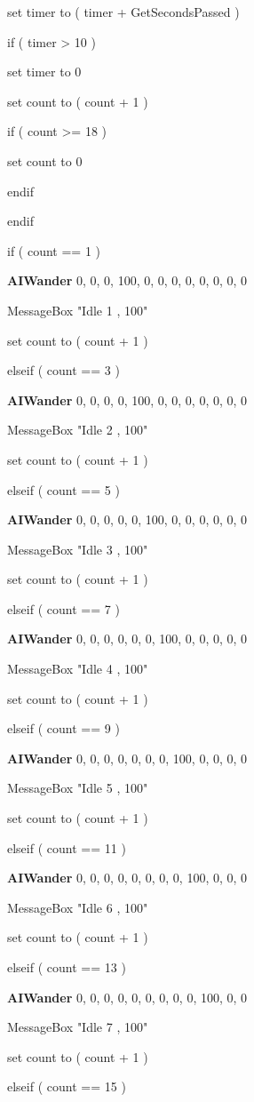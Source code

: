 \documentclass[
]{article}
\begin{document}
set timer to ( timer + GetSecondsPassed )

if ( timer \textgreater{} 10 )

set timer to 0

set count to ( count + 1 )

if ( count \textgreater= 18 )

set count to 0

endif

endif

if ( count == 1 )

\textbf{AIWander} 0, 0, 0, 100, 0, 0, 0, 0, 0, 0, 0, 0

MessageBox "Idle 1 , 100"

set count to ( count + 1 )

elseif ( count == 3 )

\textbf{AIWander} 0, 0, 0, 0, 100, 0, 0, 0, 0, 0, 0, 0

MessageBox "Idle 2 , 100"

set count to ( count + 1 )

elseif ( count == 5 )

\textbf{AIWander} 0, 0, 0, 0, 0, 100, 0, 0, 0, 0, 0, 0

MessageBox "Idle 3 , 100"

set count to ( count + 1 )

elseif ( count == 7 )

\textbf{AIWander} 0, 0, 0, 0, 0, 0, 100, 0, 0, 0, 0, 0

MessageBox "Idle 4 , 100"

set count to ( count + 1 )

elseif ( count == 9 )

\textbf{AIWander} 0, 0, 0, 0, 0, 0, 0, 100, 0, 0, 0, 0

MessageBox "Idle 5 , 100"

set count to ( count + 1 )

elseif ( count == 11 )

\textbf{AIWander} 0, 0, 0, 0, 0, 0, 0, 0, 100, 0, 0, 0

MessageBox "Idle 6 , 100"

set count to ( count + 1 )

elseif ( count == 13 )

\textbf{AIWander} 0, 0, 0, 0, 0, 0, 0, 0, 0, 100, 0, 0

MessageBox "Idle 7 , 100"

set count to ( count + 1 )

elseif ( count == 15 )
\end{document}
